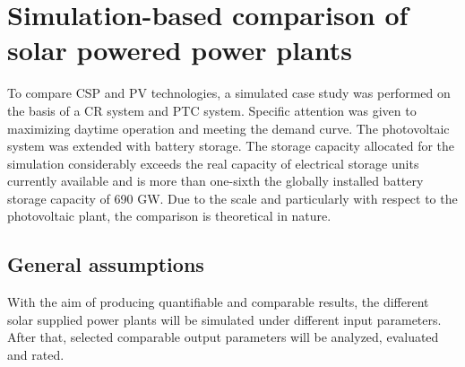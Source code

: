 \chapter{Simulation-based comparison of solar powered power plants}
To compare CSP and PV technologies, a simulated case study was performed on the basis of a CR system and PTC system. 
Specific attention was given to maximizing daytime operation and meeting the demand curve. 
The photovoltaic system was extended with battery storage. 
The storage capacity allocated for the simulation considerably exceeds the real capacity of electrical storage units currently available and is more than one-sixth the globally installed battery storage capacity of 690 GW.\cite{IEA2015}
Due to the scale and particularly with respect to the photovoltaic plant, the comparison is theoretical in nature.
\pagebreak
\section{General assumptions}
With the aim of producing quantifiable and comparable results, the different solar supplied power plants will be simulated under different input  parameters. After that, selected comparable output parameters will be analyzed, evaluated and rated.

